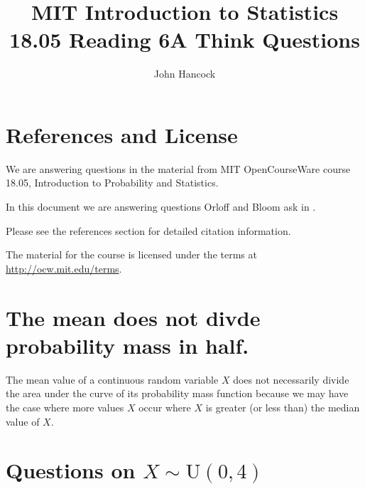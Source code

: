 \documentclass[a4paper,11pt]{article}
\author{John Hancock}
\title{MIT Introduction to Statistics 18.05 Reading 6A Think Questions }
\begin{document}
\maketitle
\tableofcontents
\section{References and License}
We are answering questions in the material from MIT OpenCourseWare
course 18.05, Introduction to Probability and Statistics.

In this document we are answering questions Orloff and Bloom ask in
\cite{reading6aQu}.

Please see the references section for detailed citation information.

The material for the course is licensed under the terms at
\url{http://ocw.mit.edu/terms}.

\section{The mean does not divde probability mass in half.}
The mean value of a continuous random variable $X$ does not necessarily divide
the area under the curve of its probability mass function because we may
have the case where more values $X$ occur where $X$ is greater (or less than)
the median value of $X$.

\section{Questions on $X \sim \text{U} \left( 0, 4 \right)$}
\printbibliography{}
\end{document}

